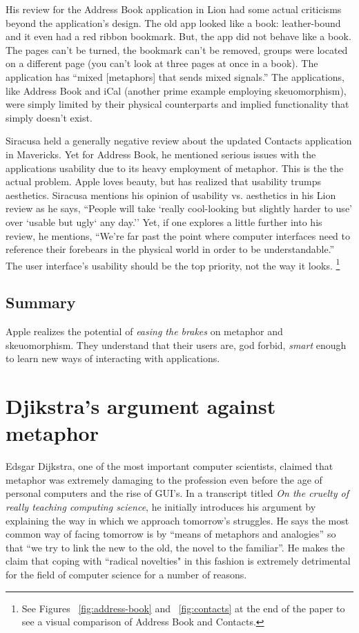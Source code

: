 \documentclass[11pt, oneside]{article}
\begin{document}
His review for the Address Book application in Lion had some actual criticisms beyond the application's design. The old app looked like a book: leather-bound and it even had a red ribbon bookmark. But, the app did not behave like a book. The pages can't be turned, the bookmark can't be removed, groups were located on a different page (you can't look at three pages at once in a book). The application has ``mixed [metaphors] that sends mixed signals.''  The applications, like Address Book and iCal (another prime example employing skeuomorphism), were simply limited by their physical counterparts and implied functionality that simply doesn't exist. \cite{ars-technica-lion}

Siracusa held a generally negative review about the updated Contacts application in Mavericks. Yet for Address Book, he mentioned serious issues with the applications usability due to its heavy employment of metaphor. This is the the actual problem. Apple loves beauty, but has realized that usability trumps aesthetics. Siracusa mentions his opinion of usability vs. aesthetics in his Lion review as he says, ``People will take `really cool-looking but slightly harder to use' over `usable but ugly` any day.'' Yet, if one explores a little further into his review, he mentions, ``We're far past the point where computer interfaces need to reference their forebears in the physical world in order to be understandable.'' The user interface's usability should be the top priority, not the way it looks. \footnote{See Figures ~\ref{fig:address-book} and ~\ref{fig:contacts} at the end of the paper to see a visual comparison of Address Book and Contacts.}
 
\subsection{Summary}
Apple realizes the potential of \textit{easing the brakes} on metaphor and skeuomorphism. They understand that their users are, god forbid, \textit{smart} enough to learn new ways of interacting with applications.

\section{Djikstra's argument against metaphor}
Edsgar Dijkstra, one of the most important computer scientists, claimed that metaphor was extremely damaging to the profession even before the age of personal computers and the rise of GUI's. In a transcript titled \textit{On the cruelty of really teaching computing science}, he initially introduces his argument by explaining the way in which we approach tomorrow's struggles. He says the most common way of facing tomorrow is by ``means of metaphors and analogies'' so that ``we try to link the new to the old, the novel to the familiar''. He makes the claim that coping with ``radical novelties" in this fashion is extremely detrimental for the field of computer science for a number of reasons.
\end{document}
